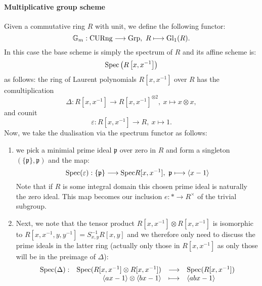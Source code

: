 \paragraph{Multiplicative group scheme}
Given a commutative ring $R$ with unit, we define the following functor:
$$\mathbb{G}_m : \mrm{CURng} \longrightarrow \mrm{Grp},\ R \longmapsto \mrm{Gl}_1(R).$$
In this case the base scheme is simply the spectrum of $R$ and its affine scheme is:
$$\mrm{Spec} \left(R\left[x,x^{-1}\right]\right)$$
as follows: the ring of Laurent polynomials $R[x,x^{-1}]$ over $R$ has the comultiplication
$$\Delta : R[x,x^{-1}] \longrightarrow R[x,x^{-1}]^{\otimes 2},\ x \longmapsto x \otimes x,$$
and counit
$$\varepsilon : R[x,x^{-1}] \longrightarrow R,\ x \longmapsto 1.$$
Now, we take the dualisation via the spectrum functor as follows:
\begin{enumerate}
\item we pick a minimial prime ideal $\mathfrak{p}$ over zero in $R$ and form a singleton $(\{\mathfrak{p}\},\mathfrak{p})$ and the map:
$$\mrm{Spec}(\varepsilon) : \{\mathfrak{p}\} \longrightarrow \mrm{Spec} R[x,x^ {-1}],\ \mathfrak{p} \longmapsto \left<x - 1\right>$$
Note that if $R$ is some integral domain this chosen prime ideal is naturally the zero ideal. This map becomes our inclusion $e : \ast \longrightarrow R^\times$ of the trivial subgroup.
\item Next, we note that the tensor product $R[x,x^{-1}] \otimes R[x,x^{-1}]$ is isomorphic to $R[x,x^{-1},y,y^{-1}] = S^{-1}_{x,y} R[x,y]$ and we therefore only need to discuss the prime ideals in the latter ring (actually only those in $R[x,x^{-1}]$ as only those will be in the preimage of $\Delta$):
$$\bao{rrcl}
\mrm{Spec}(\Delta) : &\mrm{Spec} (R[x,x^{-1}] \otimes R[x,x^{-1}]) &\longrightarrow &\mrm{Spec}(R[x,x^ {-1}])\\
& \left<a x - 1\right> \otimes \left<b x - 1\right> &\longmapsto & \left<a b x - 1\right>\\
\ea$$
\end{enumerate}
